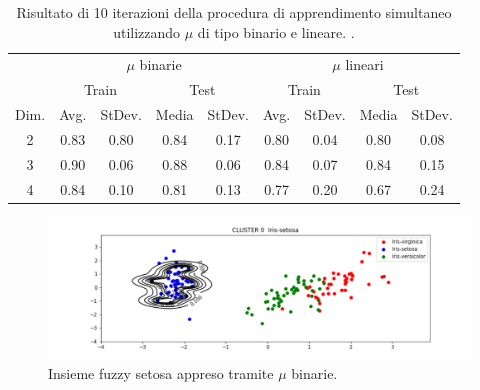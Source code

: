 \documentclass [11pt,a4paper,twoside,openright] {book}
\begin{document}
\begin{table}[!tb]
\caption{Risultato di 10 iterazioni della procedura di apprendimento simultaneo utilizzando $\mu$ di tipo binario e lineare. \label{blmu}.}
\begin{tabular}{|c|c|c|c|c|c|c|c|c|}
\hline
& \multicolumn{4}{|c|}{$\mu$ binarie} & \multicolumn{4}{|c|}{$\mu$ lineari}\\
\cline{2-9}
& \multicolumn{2}{|c|}{Train} & \multicolumn{2}{|c|}{Test} & \multicolumn{2}{|c|}{Train} & \multicolumn{2}{|c|}{Test}\\
\hline
Dim. & Avg. & StDev. & Media & StDev. & Avg. & StDev. & Media & StDev. \\
\hline
2 & 0.83 & 0.80 & 0.84 & 0.17 & 0.80 & 0.04 & 0.80 & 0.08 \\
3 & 0.90 & 0.06 & 0.88 & 0.06 & 0.84 & 0.07 & 0.84 & 0.15 \\
4 & 0.84 & 0.10 & 0.81 & 0.13 & 0.77 & 0.20 & 0.67 & 0.24 \\
\hline
\end{tabular}
\end{table}
\begin{figure}[!tb]
\centering
\includegraphics[scale=0.5]{figure/blset1.pdf}
\caption{Insieme fuzzy setosa appreso tramite $\mu$ binarie.\label{blsetosa}}
\end{figure}
\end{document}
